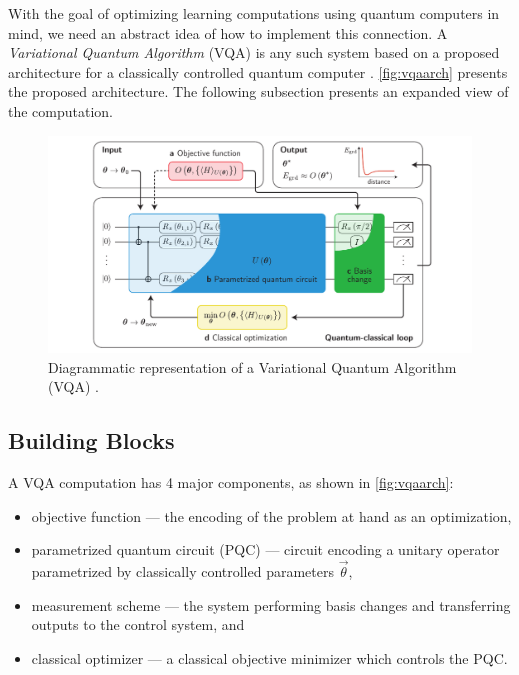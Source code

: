 
With the goal of optimizing learning computations using quantum computers in
mind, we need an abstract idea of how to implement this connection. A
\emph{Variational Quantum Algorithm} (VQA) is any such system based on a
proposed architecture for a classically controlled quantum computer
\cite{bharti2021noisy}. \autoref{fig:vqaarch} presents the proposed
architecture. The following subsection presents an expanded view of the
computation.

\begin{figure}
    \centering
    \includegraphics[width=\textwidth]{figures/vqaarch.pdf}
    \caption{Diagrammatic representation of a Variational Quantum Algorithm
    (VQA) \cite[see][chapter 2]{bharti2021noisy}.}
    \label{fig:vqaarch}
\end{figure}


\subsection{Building Blocks}

A VQA computation has 4 major components, as shown in \autoref{fig:vqaarch}:

\begin{itemize}
    \item objective function --- the encoding of the problem at hand as an
            optimization,
    \item parametrized quantum circuit (PQC) --- circuit encoding a unitary
            operator parametrized by classically controlled parameters
            \(\vec{\theta}\),
    \item measurement scheme --- the system performing basis changes and
            transferring outputs to the control system, and
    \item classical optimizer --- a classical objective minimizer which controls
            the PQC.
\end{itemize}

